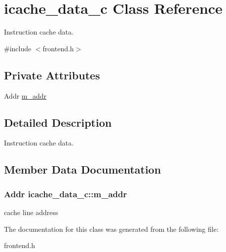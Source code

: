 \hypertarget{classicache__data__c}{
\section{icache\_\-data\_\-c Class Reference}
\label{classicache__data__c}
}


Instruction cache data.  




{\ttfamily \#include $<$frontend.h$>$}

\subsection*{Private Attributes}
\begin{DoxyCompactItemize}
\item 
Addr \hyperlink{classicache__data__c_ae1f925cbd7d5a17263d7d9d30a77d592}{m\_\-addr}
\end{DoxyCompactItemize}


\subsection{Detailed Description}
Instruction cache data. 

\subsection{Member Data Documentation}
\hypertarget{classicache__data__c_ae1f925cbd7d5a17263d7d9d30a77d592}{
\subsubsection[{m\_\-addr}]{\setlength{\rightskip}{0pt plus 5cm}Addr {\bf icache\_\-data\_\-c::m\_\-addr}}}
\label{classicache__data__c_ae1f925cbd7d5a17263d7d9d30a77d592}
cache line address 

The documentation for this class was generated from the following file:\begin{DoxyCompactItemize}
\item 
frontend.h\end{DoxyCompactItemize}
